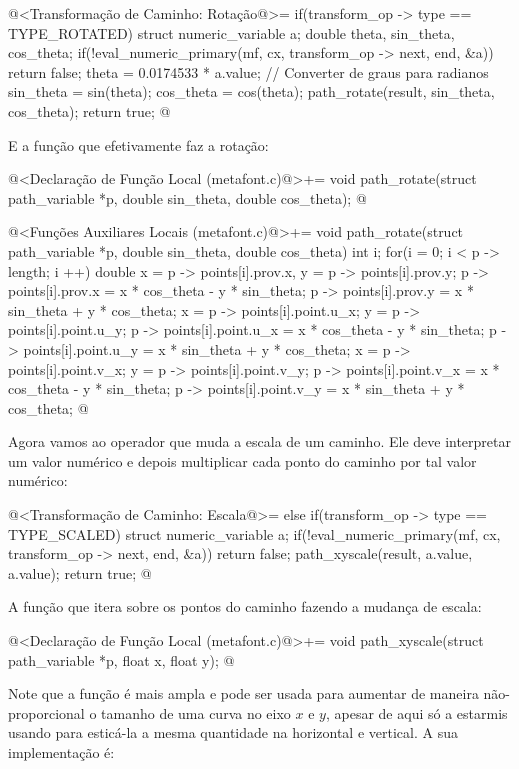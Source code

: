 {{{{{{\iniciocodigo
@<Transformação de Caminho: Rotação@>=
if(transform_op -> type == TYPE_ROTATED){
  struct numeric_variable a;
  double theta, sin_theta, cos_theta;
  if(!eval_numeric_primary(mf, cx, transform_op -> next, end, &a))
    return false;
  theta = 0.0174533 * a.value; // Converter de graus para radianos
  sin_theta = sin(theta);
  cos_theta = cos(theta);
  path_rotate(result, sin_theta, cos_theta);
  return true;
}
@
\fimcodigo

E a função que efetivamente faz a rotação:

\iniciocodigo
@<Declaração de Função Local (metafont.c)@>+=
void path_rotate(struct path_variable *p, double sin_theta,
                 double cos_theta);
@
\fimcodigo

\iniciocodigo
@<Funções Auxiliares Locais (metafont.c)@>+=
void path_rotate(struct path_variable *p, double sin_theta,
                 double cos_theta){
  int i;
  for(i = 0; i < p -> length; i ++){
    double x = p -> points[i].prov.x, y = p -> points[i].prov.y;
    p -> points[i].prov.x = x * cos_theta - y * sin_theta;
    p -> points[i].prov.y = x * sin_theta + y * cos_theta;
    x = p -> points[i].point.u_x;
    y = p -> points[i].point.u_y;
    p -> points[i].point.u_x = x * cos_theta - y * sin_theta;
    p -> points[i].point.u_y = x * sin_theta + y * cos_theta;
    x = p -> points[i].point.v_x;
    y = p -> points[i].point.v_y;
    p -> points[i].point.v_x = x * cos_theta - y * sin_theta;
    p -> points[i].point.v_y = x * sin_theta + y * cos_theta;
  }
}
@
\fimcodigo

Agora vamos ao operador que muda a escala de um caminho. Ele deve
interpretar um valor numérico e depois multiplicar cada ponto do
caminho por tal valor numérico:

@<Transformação de Caminho: Escala@>=
else if(transform_op -> type == TYPE_SCALED){
  struct numeric_variable a;
  if(!eval_numeric_primary(mf, cx, transform_op -> next, end, &a))
    return false;
  path_xyscale(result, a.value, a.value);  
  return true;
}
@
\fimcodigo

A função que itera sobre os pontos do caminho fazendo a mudança de
escala:

\iniciocodigo
@<Declaração de Função Local (metafont.c)@>+=
void path_xyscale(struct path_variable *p, float x, float y);
@
\fimcodigo

Note que a função é mais ampla e pode ser usada para aumentar de
maneira não-proporcional o tamanho de uma curva no eixo $x$ e $y$,
apesar de aqui só a estarmis usando para esticá-la a mesma quantidade
na horizontal e vertical. A sua implementação é:

}}}}}}
